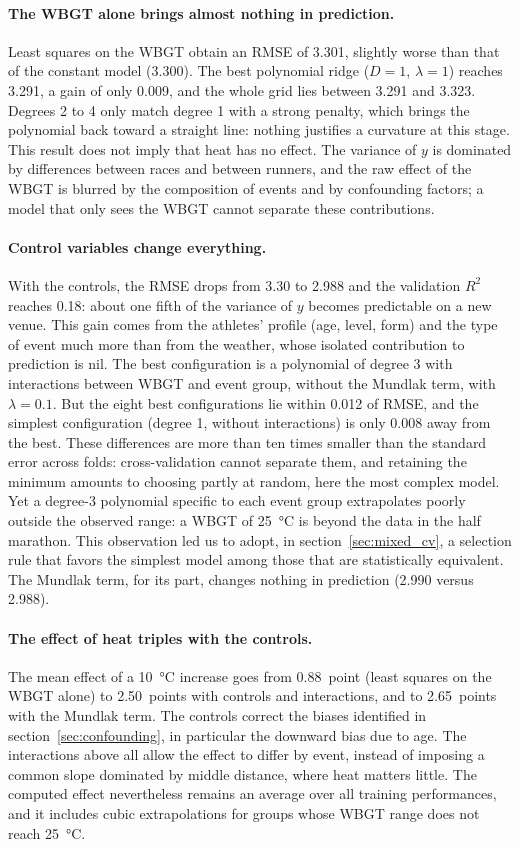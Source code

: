 \documentclass[11pt,a4paper]{article}
\begin{document}
\paragraph{The WBGT alone brings almost nothing in prediction.} Least squares on the WBGT obtain an RMSE of 3.301,
slightly worse than that of the constant model (3.300). The best polynomial ridge ($D = 1$, $\lambda = 1$) reaches
3.291, a gain of only 0.009, and the whole grid lies between 3.291 and 3.323. Degrees 2 to 4 only match degree 1 with
a strong penalty, which brings the polynomial back toward a straight line: nothing justifies a curvature at this
stage. This result does not imply that heat has no effect. The variance of $y$ is dominated by differences between
races and between runners, and the raw effect of the WBGT is blurred by the composition of events and by confounding
factors; a model that only sees the WBGT cannot separate these contributions.

\paragraph{Control variables change everything.} With the controls, the RMSE drops from 3.30 to 2.988 and the
validation $R^2$ reaches 0.18: about one fifth of the variance of $y$ becomes predictable on a new venue. This gain
comes from the athletes' profile (age, level, form) and the type of event much more than from the weather, whose
isolated contribution to prediction is nil. The best configuration is a polynomial of degree 3 with interactions
between WBGT and event group, without the Mundlak term, with $\lambda = 0.1$. But the eight best configurations lie
within 0.012 of RMSE, and the simplest configuration (degree 1, without interactions) is only 0.008 away from the best.
These differences are more than ten times smaller than the standard error across folds: cross-validation cannot
separate them, and retaining the minimum amounts to choosing partly at random, here the most complex model. Yet a
degree-3 polynomial specific to each event group extrapolates poorly outside the observed range: a WBGT of 25~°C is
beyond the data in the half marathon. This observation led us to adopt, in section~\ref{sec:mixed_cv}, a selection
rule that favors the simplest model among those that are statistically equivalent. The Mundlak term, for its part,
changes nothing in prediction (2.990 versus 2.988).

\paragraph{The effect of heat triples with the controls.} The mean effect of a 10~°C increase goes from 0.88~point
(least squares on the WBGT alone) to 2.50~points with controls and interactions, and to 2.65~points with the Mundlak
term. The controls correct the biases identified in section~\ref{sec:confounding}, in particular the downward bias due
to age. The interactions above all allow the effect to differ by event, instead of imposing a common slope dominated by
middle distance, where heat matters little. The computed effect nevertheless remains an average over all training
performances, and it includes cubic extrapolations for groups whose WBGT range does not reach 25~°C.
\end{document}
